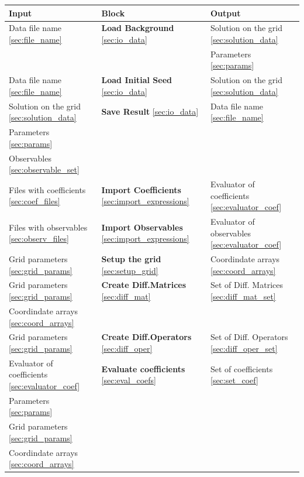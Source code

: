 \documentclass[a4paper,12pt]{article}
\begin{document}
\begin{table}[ht]

\center

\begin{tabular}{|l|l|l|}
\hline
\textbf{Input} & \textbf{Block} & \textbf{Output} \\
\hline
\hline
Data file name \ref{sec:file_name} & \textbf{Load Background} \ref{sec:io_data}  & Solution on the grid \ref{sec:solution_data} \\[0.1 cm]
&  & Parameters \ref{sec:params}\\[0.1 cm]
\hline
Data file name \ref{sec:file_name} & \textbf{Load Initial Seed} \ref{sec:io_data} & Solution on the grid \ref{sec:solution_data}  \\[0.1 cm]
\hline
Solution on the grid \ref{sec:solution_data}  & \textbf{Save Result} \ref{sec:io_data} &  Data file name \ref{sec:file_name} \\[0.1 cm]
Parameters \ref{sec:params} & &  \\
Observables \ref{sec:observable_set} & &  \\[0.1 cm]
\hline
Files with coefficients \ref{sec:coef_files} & \textbf{Import Coefficients} \ref{sec:import_expressions} & Evaluator of coefficients \ref{sec:evaluator_coef} \\[0.1 cm]
\hline
Files with observables \ref{sec:observ_files} & \textbf{Import Observables} \ref{sec:import_expressions} & Evaluator of observables \ref{sec:evaluator_coef} \\[0.1 cm]
\hline
Grid parameters \ref{sec:grid_params}& \textbf{Setup the grid} \ref{sec:setup_grid} & Coordindate arrays \ref{sec:coord_arrays} \\[0.1 cm]
\hline 
Grid parameters \ref{sec:grid_params} & \textbf{Create Diff.Matrices} \ref{sec:diff_mat} & Set of Diff. Matrices \ref{sec:diff_mat_set} \\
 Coordindate arrays \ref{sec:coord_arrays} & & \\[0.1 cm]
 \hline
Grid parameters \ref{sec:grid_params} & \textbf{Create Diff.Operators} \ref{sec:diff_oper} & Set of Diff. Operators \ref{sec:diff_oper_set} \\[0.1 cm]
\hline
\hline
Evaluator of coefficients \ref{sec:evaluator_coef} & \textbf{Evaluate coefficients} \ref{sec:eval_coefs} & Set of coefficients \ref{sec:set_coef} \\
Parameters \ref{sec:params} & & \\
Grid parameters \ref{sec:grid_params} & & \\
Coordindate arrays \ref{sec:coord_arrays}  & & \\

\end{tabular}
\end{table}
\end{document}
